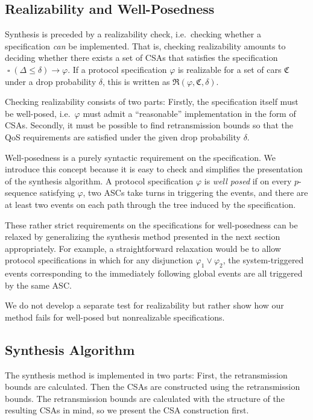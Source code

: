 \documentclass{sig-alternate}
\DeclareMathOperator{\always}{\mathop\square}
\renewcommand{\v}{\varphi}
\renewcommand{\d}{\delta}
\newcommand{\dropprob}{\Delta}
\newcommand{\SAP}{\mathfrak{C}}
\newcommand{\Realiz}{\mathfrak{R}}
\newcommand{\define}{\sl}
\begin{document}
\subsection{Realizability and Well-Posedness}


Synthesis is preceded by a realizability check, i.e.\ checking whether a specification \emph{can} be implemented. That is, checking realizability amounts to deciding whether there exists a set of CSAs that satisfies the specification $\always(\dropprob \leq \d) \rightarrow \varphi$. If a protocol specification $\v$ is realizable for a set of cars $\SAP$ under a drop probability $\d$, this is written as $\Realiz(\v, \SAP, \d)$.

Checking realizability consists of two parts: Firstly, the specification itself must be well-posed, i.e.\ $\v$ must admit a ``reasonable'' implementation in the form of CSAs. Secondly, it must be possible to find retransmission bounds so that the QoS requirements are satisfied under the given drop probability $\d$.

Well-posedness is a purely syntactic requirement on the specification. We introduce this concept because it is easy to check and simplifies the presentation of the synthesis algorithm. A protocol specification $\v$ is {\define well posed} if on every $p$-sequence satisfying $\v$, two ASCs take turns in triggering the events, and there are at least two events on each path through the tree induced by the specification.

These rather strict requirements on the specifications for well-posedness can be relaxed by generalizing the synthesis method presented in the next section appropriately. For example, a straightforward relaxation would be to allow protocol specifications in which for any disjunction $\v_1 \vee \v_2$, the system-triggered events corresponding to the immediately following global events are all triggered by the same ASC.

We do not develop a separate test for realizability but rather show how our method fails for well-posed but nonrealizable specifications.


\subsection{Synthesis Algorithm}


The synthesis method is implemented in two parts: First, the retransmission bounds are calculated. Then the CSAs are constructed using the retransmission bounds. The retransmission bounds are calculated with the structure of the resulting CSAs in mind, so we present the CSA construction first.
\end{document}
